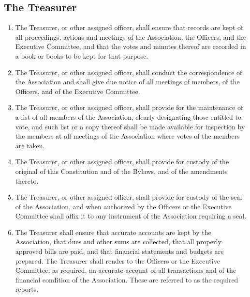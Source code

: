 \subsection{The Treasurer}
\begin{enumerate}
	\item The Treasurer, or other assigned officer, shall ensure that records are kept of all proceedings, actions and meetings of the Association, the Officers, and the Executive Committee, and that the votes and minutes thereof are recorded in a book or books to be kept for that purpose.
	\item The Treasurer, or other assigned officer, shall conduct the correspondence of the Association and shall give due notice of all meetings of members, of the Officers, and of the Executive Committee.
	\item The Treasurer, or other assigned officer, shall provide for the maintenance of a list of all members of the Association, clearly designating those entitled to vote, and such list or a copy thereof shall be made available for inspection by the members at all meetings of the Association where votes of the members are taken.
	\item The Treasurer, or other assigned officer, shall provide for custody of the original of this Constitution and of the Bylaws, and of the amendments thereto.
	\item The Treasurer, or other assigned officer, shall provide for custody of the seal of the Association, and when authorized by the Officers or the Executive Committee shall affix it to any instrument of the Association requiring a seal.
	\item The Treasurer shall ensure that accurate accounts are kept by the Association, that dues and other sums are collected, that all properly approved bills are paid, and that financial statements and budgets are prepared. The Treasurer shall render to the Officers or the Executive Committee, as required, an accurate account of all transactions and of the financial condition of the Association. These are referred to as the required reports.
\end{enumerate}

